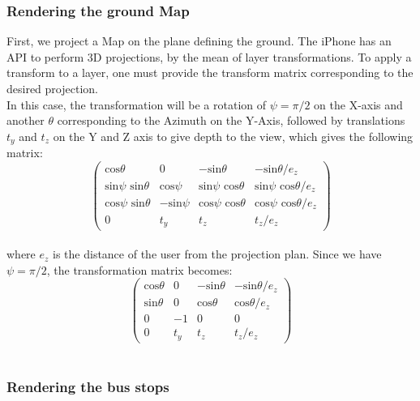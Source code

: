 \subsubsection{Rendering the ground Map}

First, we project a Map on the plane defining the ground. The iPhone has an API to perform 3D projections, by the mean of layer transformations. To apply a transform to a layer, one must provide the transform matrix corresponding to the desired projection.\\

In this case, the transformation will be a rotation of $\psi = \pi/2$ on the X-axis and another $\theta$ corresponding to the Azimuth on the Y-Axis, followed by translations $t_y$ and $t_z$ on the Y and Z axis to give depth to the view, which gives the following matrix:\\

\[ \left( \begin{array}{cccc}
	\textrm{cos} \theta 				& 0 					& -\textrm{sin} \theta 				& - \textrm{sin} \theta / e_z\\
	\textrm{sin} \psi \textrm{ sin} \theta 	& \textrm{cos} \psi		& \textrm{sin} \psi \textrm{ cos} \theta 	& \textrm{sin} \psi \textrm{ cos} \theta  / e_z\\
	\textrm{cos} \psi \textrm{ sin} \theta	& -\textrm{sin} \psi		& \textrm{cos} \psi \textrm{ cos} \theta	& \textrm{cos} \psi \textrm{ cos} \theta / e_z\\
	0							& t_y					& t_z 							& t_z / e_z
\end{array} \right)\]\\

where $e_z$ is the distance of the user from the projection plan. Since we have $\psi = \pi / 2$, the transformation matrix becomes: \\

\[ \left( \begin{array}{cccc}
	\textrm{cos} \theta	& 0 				& -\textrm{sin} \theta 	& - \textrm{sin} \theta / e_z\\
	\textrm{sin} \theta 	& 0				& \textrm{cos} \theta 		& \textrm{cos} \theta  / e_z\\
	0				& -1				& 0					& 0\\
	0				& t_y				& t_z 				& t_z / e_z
\end{array} \right)\]\\

\subsubsection{Rendering the bus stops}


